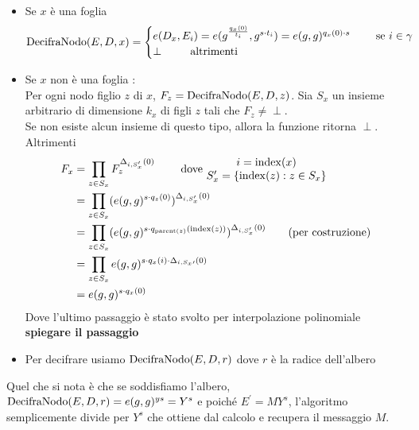 \begin{description}
\begin{itemize}
\item Se $x$ è una foglia
\[ \operatorname{DecifraNodo}(E,D,x) = \begin{cases}
e(D_x,E_i) = e(g^{\frac{q_x(0)}{t_i}},g^{s\cdot t_i}) = e(g,g)^{q_x(0) \cdot s} \qquad \text{ se } i \in \gamma \\
\perp \qquad \text{ altrimenti}  
\end{cases} \]
\item Se $x$ non è una foglia :\\
Per ogni nodo figlio $z$ di $x$, $F_z = \operatorname{DecifraNodo}(E,D,z)$. Sia $S_x$\label{insiemedecript} un insieme arbitrario di dimensione $k_x$ di figli $z$ tali che $F_z \neq \perp$.\\
Se non esiste alcun insieme di questo tipo, allora la funzione ritorna $\perp$. Altrimenti
\begin{align*}
F_x &= \prod_{z \in S_x} F_z^{\Delta_{i,S_x^\prime}(0)} \qquad \text{ dove }
\begin{matrix}
i = \operatorname{index}(x)\\
S^\prime_x = \{ \operatorname{index}(z) : z \in S_x \}
\end{matrix}\\
&= \prod_{z \in S_x} (e(g,g)^{s \cdot q_z(0)})^{\Delta_{i,S_x^\prime}(0)}\\
&= \prod_{z \in S_x} (e(g,g)^{s \cdot q_{\operatorname{parent}(z)}(\operatorname{index}(z))})^{\Delta_{i,S_x^\prime}(0)} \qquad \text{(per costruzione)}\\
&= \prod_{z \in S_x} e(g,g)^{s \cdot q_x(i) \cdot \Delta_{i,S_x\prime}(0)}\\
&= e(g,g)^{s \cdot q_x(0)} 
\end{align*}
Dove l'ultimo passaggio è stato svolto per interpolazione polinomiale \textbf{spiegare il passaggio}

\item Per decifrare usiamo $\operatorname{DecifraNodo} (E,D,r)$ dove $r$ è la radice dell'albero
\end{itemize}
Quel che si nota è che se soddisfiamo l'albero, $\operatorname{DecifraNodo} (E,D,r) = e(g,g)^{ys} = Y^s$ e poiché $E^\prime = MY^s$, l'algoritmo semplicemente divide per $Y^s$ che ottiene dal calcolo e recupera il messaggio $M$.
\end{description}


